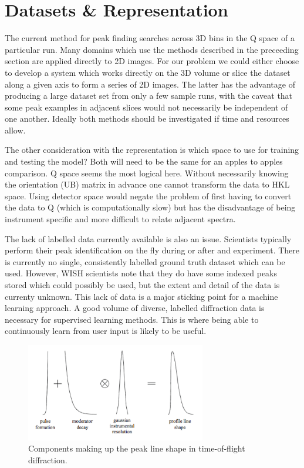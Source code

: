 \documentclass[paper=a4, fontsize=8pt]{scrartcl} \usepackage[T1]{fontenc}
\begin{document}
\section{Datasets \& Representation}
\label{sec:data}
The current method for peak finding searches across 3D bins in the Q space of a 
particular run. Many domains which use the methods described in the preceeding section are applied 
directly to 2D images. For our problem we could either choose to develop a 
system which works directly on the 3D volume or slice the dataset
along a given axis to form a series of 2D images. The latter has the advantage 
of producing a large dataset set from only a few sample runs, with the 
caveat that some peak examples in adjacent slices would not necessarily be 
independent of one another. Ideally both methods should be investigated if time
and resources allow.

The other consideration with the representation is which space to use for
training and testing the model? Both will need to be the same for an apples to 
apples comparison. Q space seems the most logical here. Without necessarily 
knowing the orientation (UB) matrix in advance one cannot transform the data to HKL space. 
Using detector space would negate the problem of first having to convert the
data to Q (which is computationally slow) but has the disadvantage of being 
instrument specific and more difficult to relate adjacent spectra.

The lack of labelled data currently available is also an issue. Scientists
typically perform their peak identification on the fly during or after and experiment. There is
currently no single, consistently labelled ground truth dataset which can be
used. However, WISH scientists note that they do have some indexed peaks stored
which could possibly be used, but the extent and detail of the data is currenty unknown. 
This lack of data is a major sticking point for a machine 
learning approach. A good volume of diverse, labelled diffraction data is 
necessary for supervised learning methods. This is where being able to 
continuously learn from user input is likely to be useful. 


\begin{figure}[H]
\centering
\includegraphics[width=0.7\textwidth]{peak-profile.png}
\caption{Components making up the peak line shape in time-of-flight diffraction.}
\label{fig:peak-profile}
\end{figure}
\end{document}
